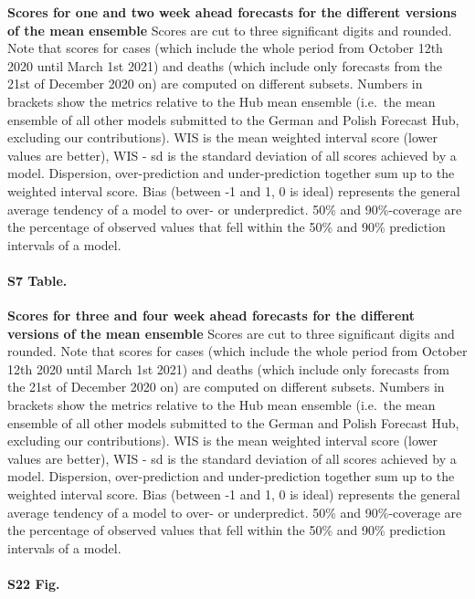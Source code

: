 \documentclass[10pt,letterpaper]{article}
\begin{document}
\textbf{Scores for one and two week ahead forecasts for the different versions of the mean ensemble}
Scores are cut to three significant digits and rounded. Note that scores
for cases (which include the whole period from October 12th 2020 until
March 1st 2021) and deaths (which include only forecasts from the 21st
of December 2020 on) are computed on different subsets. Numbers in
brackets show the metrics relative to the Hub mean ensemble (i.e.~the
mean ensemble of all other models submitted to the German and Polish
Forecast Hub, excluding our contributions). WIS is the mean weighted
interval score (lower values are better), WIS - sd is the standard
deviation of all scores achieved by a model. Dispersion, over-prediction
and under-prediction together sum up to the weighted interval score.
Bias (between -1 and 1, 0 is ideal) represents the general average
tendency of a model to over- or underpredict. 50\% and 90\%-coverage are
the percentage of observed values that fell within the 50\% and 90\%
prediction intervals of a model.

\paragraph{S7 Table.}
\label{tab:score-table-ensemble-mean-4}

\textbf{Scores for three and four week ahead forecasts for the different versions of the mean ensemble}
Scores are cut to three significant digits and rounded. Note that scores
for cases (which include the whole period from October 12th 2020 until
March 1st 2021) and deaths (which include only forecasts from the 21st
of December 2020 on) are computed on different subsets. Numbers in
brackets show the metrics relative to the Hub mean ensemble (i.e.~the
mean ensemble of all other models submitted to the German and Polish
Forecast Hub, excluding our contributions). WIS is the mean weighted
interval score (lower values are better), WIS - sd is the standard
deviation of all scores achieved by a model. Dispersion, over-prediction
and under-prediction together sum up to the weighted interval score.
Bias (between -1 and 1, 0 is ideal) represents the general average
tendency of a model to over- or underpredict. 50\% and 90\%-coverage are
the percentage of observed values that fell within the 50\% and 90\%
prediction intervals of a model.

\paragraph{S22 Fig.}
\label{fig:agg-performance-all-late}
\end{document}
